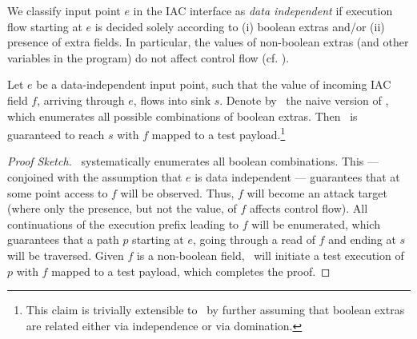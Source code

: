 \begin{definition}\label{De:dataind} We classify input point $e$ in the IAC interface as \emph{data independent} if execution flow starting at $e$ is decided solely according to (i) boolean extras and/or (ii) presence of extra fields. In particular, the values of non-boolean extras (and other variables in the program) do not affect control flow (cf. \cite{SYGABSV:ISSTA14,W:POPL86}).
\end{definition}

\begin{theorem}[Coverage] Let $e$ be a data-independent input point, such that the value of incoming IAC field $f$, arriving through $e$, flows into sink $s$. 
	Denote by \ETool\ the naive version of \Tool, which enumerates all possible combinations of boolean extras.
	Then \ETool\ is guaranteed to reach $s$ with $f$ mapped to a test payload.\footnote{
		This claim is trivially extensible to \Tool\ by further assuming that boolean extras are related either via independence or via domination.
	}
	\begin{proof}[Proof Sketch] \ETool\ systematically enumerates all boolean combinations. This --- conjoined with the assumption that $e$ is data independent --- guarantees that at some point access to $f$ will be observed. Thus, $f$ will become an attack target (where only the presence, but not the value, of $f$ affects control flow). All continuations of the execution prefix leading to $f$ will be enumerated, which guarantees that a path $p$ starting at $e$, going through a read of $f$ and ending at $s$ will be traversed. Given $f$ is a non-boolean field, \ETool\ will initiate a test execution of $p$ with $f$ mapped to a test payload, which completes the proof.
	\end{proof}
\end{theorem}